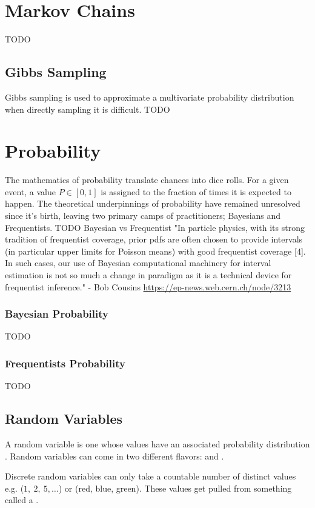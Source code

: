\section{Markov Chains}
TODO

\subsection{Gibbs Sampling}
Gibbs sampling is used to approximate a multivariate probability distribution when directly sampling it is difficult. 
TODO

\section{Probability}
The mathematics of probability translate chances into dice rolls. For a given event, a value $P\in[0,1]$ is assigned to the fraction of times it is expected to happen. The theoretical underpinnings of probability have remained unresolved since it's birth, leaving two primary camps of practitioners; Bayesians and Frequentists.
TODO Bayesian vs Frequentist
"In particle physics, with its strong tradition of frequentist coverage, prior pdfs are often chosen to provide intervals (in particular upper limits for Poisson means) with good frequentist coverage [4]. In such cases, our use of Bayesian computational machinery for interval estimation is not so much a change in paradigm as it is a technical device for frequentist inference." - Bob Cousins \url{https://ep-news.web.cern.ch/node/3213}
\subsubsection{Bayesian Probability}
TODO
\subsubsection{Frequentists Probability}
TODO



\subsection{Random Variables}
A random variable is one whose values have an associated probability distribution \cite{grus}. Random variables can come in two different flavors:  and . 

Discrete random variables can only take a countable number of distinct values e.g. ($1,~2, ~5,\ldots$) or (red, blue, green). These values get pulled from something called a .

